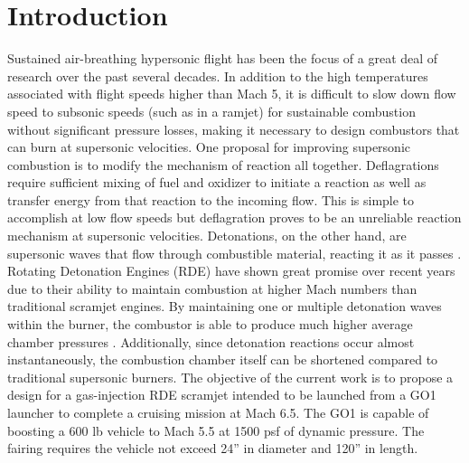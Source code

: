 \section{Introduction}
Sustained air-breathing hypersonic flight has been the focus of a great deal of research over the past several decades. In addition to the high temperatures associated with flight speeds higher than Mach 5, it is difficult to slow down flow speed to subsonic speeds (such as in a ramjet) for sustainable combustion without significant pressure losses, making it necessary to design combustors that can burn at supersonic velocities. One proposal for improving supersonic combustion is to modify the mechanism of reaction all together. Deflagrations require sufficient mixing of fuel and oxidizer to initiate a reaction as well as transfer energy from that reaction to the incoming flow. This is simple to accomplish at low flow speeds but deflagration proves to be an unreliable reaction mechanism at supersonic velocities. Detonations, on the other hand, are supersonic waves that flow through combustible material, reacting it as it passes \cite{wang}. Rotating Detonation Engines (RDE) have shown great promise over recent years due to their ability to maintain combustion at higher Mach numbers than traditional scramjet engines. By maintaining one or multiple detonation waves within the burner, the combustor is able to produce much higher average chamber pressures \cite{bykovskii}.  Additionally, since detonation reactions occur almost instantaneously, the combustion chamber itself can be shortened compared to traditional supersonic burners. The objective of the current work is to propose a design for a gas-injection RDE scramjet intended to be launched from a GO1 launcher to complete a cruising mission at Mach 6.5. The GO1 is capable of boosting a 600 lb vehicle to Mach 5.5 at 1500 psf of dynamic pressure. The fairing requires the vehicle not exceed 24” in diameter and 120” in length. 